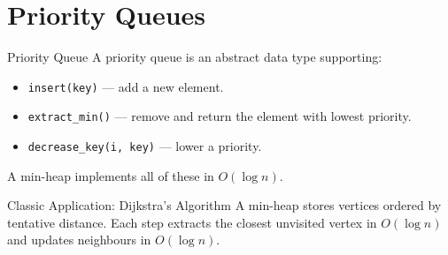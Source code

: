 \documentclass[10pt,aspectratio=169]{beamer}
\begin{document}
\section{Priority Queues}

\begin{frame}{Priority Queue}
  A \alert{priority queue} is an abstract data type supporting:
  \begin{itemize}
    \item \texttt{insert(key)} — add a new element.
    \item \texttt{extract\_min()} — remove and return the element with lowest priority.
    \item \texttt{decrease\_key(i, key)} — lower a priority.
  \end{itemize}

  \bigskip
  A min-heap implements all of these in $O(\log n)$.

  \bigskip
  \begin{block}{Classic Application: Dijkstra's Algorithm}
    A \alert{min-heap} stores vertices ordered by tentative distance.
    Each step extracts the closest unvisited vertex in $O(\log n)$
    and updates neighbours in $O(\log n)$.
  \end{block}
\end{frame}
\end{document}
